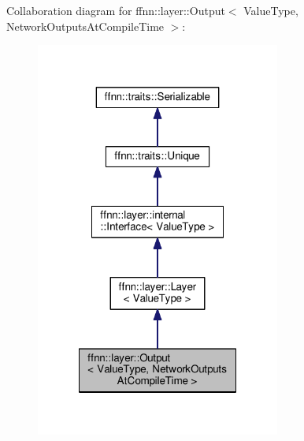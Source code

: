 Collaboration diagram for ffnn\-:\-:layer\-:\-:Output$<$ Value\-Type, Network\-Outputs\-At\-Compile\-Time $>$\-:
\nopagebreak
\begin{figure}[H]
\begin{center}
\leavevmode
\includegraphics[width=228pt]{classffnn_1_1layer_1_1_output__coll__graph}
\end{center}
\end{figure}
